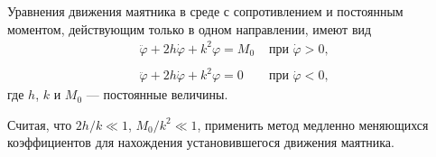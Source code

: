 Уравнения движения маятника в среде с сопротивлением и постоянным моментом,
действующим только в одном направлении, имеют вид
$$
	\begin{array}{ll}
		\ddot{\varphi} + 2h\dot{\varphi} + k^2\varphi = M_0
		&\mbox{ при } \dot{\varphi} > 0, \\
		\\
		\ddot{\varphi} + 2h\dot{\varphi} + k^2\varphi = 0
		&\mbox{ при } \dot{\varphi} < 0,
	\end{array}
$$
где $h$, $k$ и $M_0$ --- постоянные величины.

Считая, что $2h/k \ll 1$, $M_0 /k^2 \ll 1$,
применить метод медленно меняющихся коэффициентов
для нахождения установившегося движения маятника.
